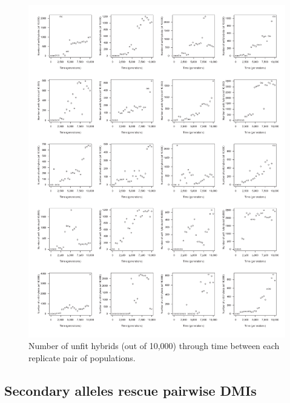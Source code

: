 \begin{doublespace}
\begin{figure}
\begin{center}
\includegraphics[width=0.9\linewidth]{unfit-hybrid-counts-indiv-plots.pdf}
\end{center}
\caption{Number of unfit hybrids (out of 10,000) through time
  between each replicate pair of populations.}
\label{fig:indiv-unfit-hybrids}
\end{figure}



\subsection{Secondary alleles rescue pairwise DMIs}


\end{doublespace}
